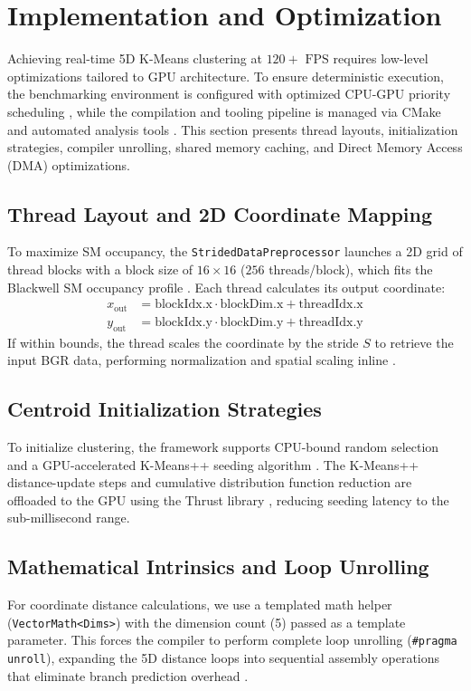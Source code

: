 \section{Implementation and Optimization}\label{sec:implementation}
Achieving real-time 5D K-Means clustering at $120+\text{ FPS}$ \cite{cruden2019simulator, jerald2009scene} requires low-level optimizations tailored to GPU architecture. To ensure deterministic execution, the benchmarking environment is configured with optimized CPU-GPU priority scheduling \cite{microsoft_priority_separation_official, intel_thermal_ultra_gen}, while the compilation and tooling pipeline is managed via CMake and automated analysis tools \cite{cmake_official, clang_tools}. This section presents thread layouts, initialization strategies, compiler unrolling, shared memory caching, and Direct Memory Access (DMA) optimizations.

\subsection{Thread Layout and 2D Coordinate Mapping}
To maximize SM occupancy, the \texttt{StridedData\allowbreak Preprocessor} launches a 2D grid of thread blocks with a block size of $16 \times 16$ ($256$ threads/block), which fits the Blackwell SM occupancy profile \cite{CudaGuide, cook2012cuda}. Each thread calculates its output coordinate:
\begin{align}
x_{\text{out}} &= \text{blockIdx.x} \cdot \text{blockDim.x} + \text{threadIdx.x} \\
y_{\text{out}} &= \text{blockIdx.y} \cdot \text{blockDim.y} + \text{threadIdx.y}
\end{align}
If within bounds, the thread scales the coordinate by the stride $S$ to retrieve the input BGR data, performing normalization and spatial scaling inline \cite{CudaGuide, cook2012cuda}.

\subsection{Centroid Initialization Strategies}
To initialize clustering, the framework supports CPU-bound random selection and a GPU-accelerated K-Means++ seeding algorithm \cite{arthur2007k}. The K-Means++ distance-update steps and cumulative distribution function reduction are offloaded to the GPU using the Thrust library \cite{bell2012thrust}, reducing seeding latency to the sub-millisecond range.

\subsection{Mathematical Intrinsics and Loop Unrolling}
For coordinate distance calculations, we use a templated math helper (\texttt{VectorMath<Dims>}) with the dimension count (5) passed as a template parameter. This forces the compiler to perform complete loop unrolling (\texttt{\#pragma unroll}), expanding the 5D distance loops into sequential assembly operations that eliminate branch prediction overhead \cite{CudaGuide, stroustrup2022tour, cook2012cuda}.

